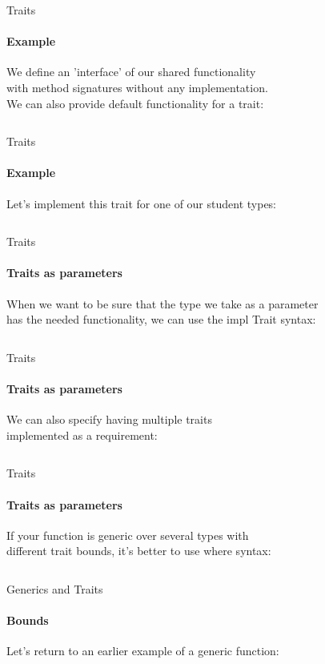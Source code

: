 \documentclass[usenames,dvipsnames,10pt,aspectratio=169]{beamer}
\begin{document}
\begin{frame}{Traits}
	\framesubtitle{Example}
	\large
	We define an 'interface' of our shared functionality\\
	with method signatures without any implementation.\\
	We can also provide default functionality for a trait:\\
	\vspace{0.2cm}
	\inputminted[fontsize=\normalsize]{rust}{code/traits1.rs}
	\vspace{0.2cm}
\end{frame}

\begin{frame}{Traits}
	\framesubtitle{Example}
	\large
	Let's implement this trait for one of our student types:\\
	\vspace{0.2cm}
	\inputminted[fontsize=\normalsize]{rust}{code/traits2.rs}
\end{frame}

\begin{frame}{Traits}
	\framesubtitle{Traits as parameters}
	\large
	When we want to be sure that the type we take as a parameter\\
	has the needed functionality, we can use the \textcolor{ucuyellow}{impl Trait} syntax:\\
	\vspace{0.2cm}
	\inputminted[fontsize=\large]{rust}{code/traits3.rs}
\end{frame}

\begin{frame}{Traits}
	\framesubtitle{Traits as parameters}
	\large
	We can also specify having multiple traits\\
	implemented as a requirement:\\
	\vspace{0.2cm}
	\inputminted[fontsize=\large]{rust}{code/traits4.rs}
\end{frame}

\begin{frame}{Traits}
	\framesubtitle{Traits as parameters}
	\large
	If your function is generic over several types with\\
	different trait bounds, it's better to use \textcolor{ucuyellow}{where} syntax:\\	
	\vspace{0.2cm}
	\inputminted[fontsize=\large]{rust}{code/traits5.rs}
\end{frame}

\begin{frame}{Generics and Traits}
	\framesubtitle{Bounds}
	\large
	Let's return to an earlier example of a generic function:
	\vspace{0.2cm}
	\inputminted[fontsize=\Large]{rust}{code/generics5.rs}
	\vspace{0.2cm}
\end{frame}
\end{document}
